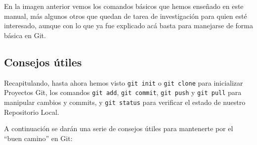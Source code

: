 \documentclass{article}
\begin{document}

En la imagen anterior vemos los comandos básicos que hemos enseñado en este manual, más algunos otros que quedan de tarea de investigación para quien esté interesado, aunque con lo que ya fue explicado acá basta para manejarse de forma básica en Git.

\subsection{Consejos útiles}

Recapitulando, hasta ahora hemos visto \texttt{git init} o \texttt{git clone} para inicializar Proyectos Git, los comandos \texttt{git add}, \texttt{git commit}, \texttt{git push} y \texttt{git pull} para manipular cambios y commits, y \texttt{git status} para verificar el estado de nuestro Repositorio Local.

A continuación se darán una serie de consejos útiles para mantenerte por el ``buen camino'' en Git:
\end{document}
